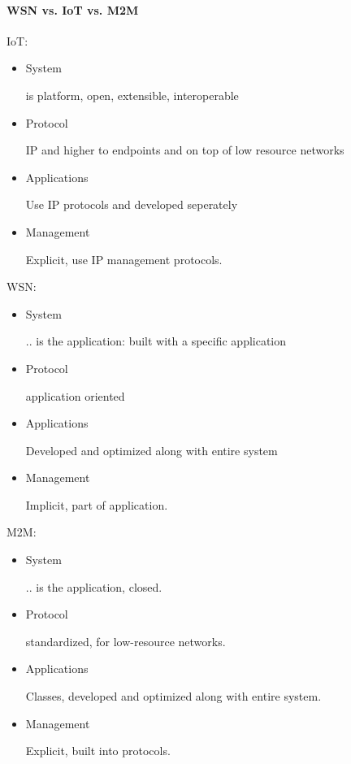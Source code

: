 \documentclass[11pt]{article}
\begin{document}
    \paragraph{WSN vs. IoT vs. M2M}
    IoT:
    \begin{itemize}
        \item System

        is platform, open, extensible, interoperable
        \item Protocol

        IP and higher to endpoints and on top of low resource networks
        \item Applications

        Use IP protocols and developed seperately
        \item Management

        Explicit, use IP management protocols.
    \end{itemize}
    WSN:
    \begin{itemize}
        \item System

        .. is the application: built with a specific application
        \item Protocol

        application oriented
        \item Applications

        Developed and optimized along with entire system
        \item Management

        Implicit, part of application.
    \end{itemize}
    M2M:
    \begin{itemize}
        \item System

        .. is the application, closed.
        \item Protocol

        standardized, for low-resource networks.
        \item Applications

        Classes, developed and optimized along with entire system.
        \item Management

        Explicit, built into protocols.
    \end{itemize}
\end{document}
